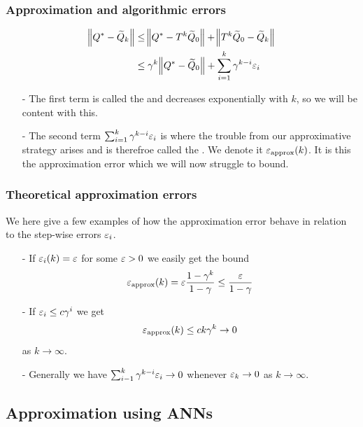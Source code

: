 \documentclass{beamer}[10]
\begin{document}
\begin{frame}
  \frametitle{Approximation and algorithmic errors}
  \begin{align*}
    \norm{Q^* - \widetilde{Q}_k}
    &\leq \norm{Q^* - T^k \widetilde{Q}_0} + \norm{T^k \widetilde{Q}_0 - \widetilde{Q}_k}
    \\ & \leq
    \gamma^k \norm{Q^* - \widetilde{Q}_0} + \sum_{i=1}^k \gamma^{k-i} \varepsilon_i
  \end{align*}
  \begin{small}
    \begin{itemize}
      \item[-] The first term is called the 
	and decreases
	exponentially with $k$, so we will be content with this.
      \item[-] The second term $\sum_{i=1}^k \gamma^{k-i} \varepsilon_i$
	is where the trouble from our approximative strategy arises
	and is therefroe called the .
	We denote it $\varepsilon_{\mathrm{approx}}(k)$.
	It is this the approximation error which we will now struggle
	to bound.
    \end{itemize}
  \end{small}
\end{frame}

\begin{frame}
  \frametitle{Theoretical approximation errors}
  We here give a few examples of how the approximation error behave in relation
  to the step-wise errors $\varepsilon_i$.
  \begin{itemize}
    \item[-] If $\varepsilon_i(k) = \varepsilon$ for some $\varepsilon > 0$ we easily get the bound
      $$ \varepsilon_{\mathrm{approx}}(k) =
      \varepsilon \frac{1-\gamma^k}{1-\gamma} \leq \frac{\varepsilon}{1-\gamma} $$
    \item[-] If $\varepsilon_i \leq c\gamma^i$ we get
      $$ \varepsilon_{\mathrm{approx}}(k) \leq ck \gamma^k \to 0$$
      as $k \to \infty$.
    \item[-] Generally we have
      $ \sum_{i-1}^k \gamma^{k-i} \varepsilon_i \to 0 $
      whenever $\varepsilon_k \to 0$ as $k \to \infty$.
  \end{itemize}
\end{frame}

\subsection{Approximation using ANNs}
\end{document}
